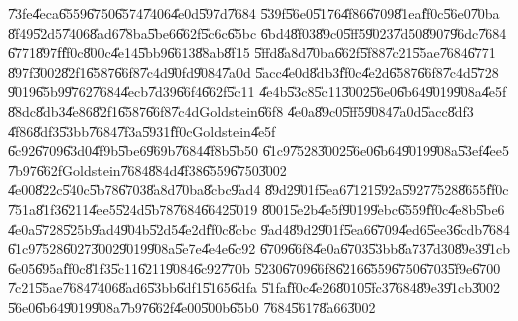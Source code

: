 \documentclass[12pt,a4paper]{article}
\begin{document}
\U{73fe}\U{4eca}\U{6559}\U{6750}\U{6574}\U{7406}\U{4e0d}\U{597d}\U{7684}%
\U{539f}\U{56e0}\U{5176}\U{4f86}\U{6709}\U{81ea}\U{ff0c}\U{56e0}\U{70ba}%
\U{8f49}\U{52d5}\U{7406}\U{8ad6}\U{78ba}\U{5be6}\U{662f}\U{5c6c}\U{65bc}%
\U{6bd4}\U{8f03}\U{89c0}\U{5ff5}\U{9023}\U{7d50}\U{8907}\U{96dc}\U{7684}%
\U{6771}\U{897f}\U{ff0c}\U{800c}\U{4e14}\U{5bb9}\U{6613}\U{88ab}\U{8f15}%
\U{5ffd}\U{8a8d}\U{70ba}\U{662f}\U{5f88}\U{7c21}\U{55ae}\U{7684}\U{6771}%
\U{897f}\U{3002}\U{82f1}\U{6587}\U{66f8}\U{7c4d}\U{90fd}\U{9084}\U{7a0d}%
\U{5acc}\U{4e0d}\U{8db3}\U{ff0c}\U{4e2d}\U{6587}\U{66f8}\U{7c4d}\U{5728}%
\U{9019}\U{65b9}\U{9762}\U{7684}\U{4ecb}\U{7d39}\U{66f4}\U{662f}\U{5c11}%
\U{4e4b}\U{53c8}\U{5c11}\U{3002}\U{56e0}\U{6b64}\U{9019}\U{908a}\U{4e5f}%
\U{88dc}\U{8db3}\U{4e86}\U{82f1}\U{6587}\U{66f8}\U{7c4d}Goldstein\U{66f8}%
\U{4e0a}\cite{goldstein}\U{89c0}\U{5ff5}\U{9084}\U{7a0d}\U{5acc}\U{8df3}%
\U{4f86}\U{8df3}\U{53bb}\U{7684}\U{7f3a}\U{5931}\U{ff0c}Goldstein\U{4e5f}%
\U{6c92}\U{6709}\U{63d0}\U{4f9b}\U{5be6}\U{969b}\U{7684}\U{4f8b}\U{5b50}%
\U{61c9}\U{7528}\U{3002}\U{56e0}\U{6b64}\U{9019}\U{908a}\U{53ef}\U{4ee5}%
\U{7b97}\U{662f}Goldstein\U{7684}\U{884d}\U{4f38}\U{6559}\U{6750}\U{3002}%
\U{4e00}\U{822c}\U{540c}\U{5b78}\U{6703}\U{8a8d}\U{70ba}\U{8cbc}\U{9ad4}%
\U{89d2}\U{901f}\U{5ea6}\U{7121}\U{592a}\U{5927}\U{7528}\U{8655}\U{ff0c}%
\U{751a}\U{81f3}\U{6211}\U{4ee5}\U{524d}\U{5b78}\U{7684}\U{6642}\U{5019}%
\U{8001}\U{5e2b}\U{4e5f}\U{9019}\U{9ebc}\U{6559}\U{ff0c}\U{4e8b}\U{5be6}%
\U{4e0a}\U{5728}\U{525b}\U{9ad4}\U{904b}\U{52d5}\U{4e2d}\U{ff0c}\U{8cbc}%
\U{9ad4}\U{89d2}\U{901f}\U{5ea6}\U{6709}\U{4ed6}\U{5ee3}\U{6cdb}\U{7684}%
\U{61c9}\U{7528}\U{6027}\U{3002}\U{9019}\U{908a}\U{5e7e}\U{4e4e}\U{6c92}%
\U{6709}\U{66f8}\U{4e0a}\U{6703}\U{53bb}\U{8a73}\U{7d30}\U{89e3}\U{91cb}%
\U{6e05}\U{695a}\U{ff0c}\U{81f3}\U{5c11}\U{6211}\U{9084}\U{6c92}\U{770b}%
\U{5230}\U{6709}\U{66f8}\U{6216}\U{6559}\U{6750}\U{6703}\U{5f9e}\U{6700}%
\U{7c21}\U{55ae}\U{7684}\U{7406}\U{8ad6}\U{53bb}\U{6df1}\U{5165}\U{6dfa}%
\U{51fa}\U{ff0c}\U{4e26}\U{8010}\U{5fc3}\U{7684}\U{89e3}\U{91cb}\U{3002}%
\U{56e0}\U{6b64}\U{9019}\U{908a}\U{7b97}\U{662f}\U{4e00}\U{500b}\U{65b0}%
\U{7684}\U{5617}\U{8a66}\U{3002}

\bigskip
\end{document}
